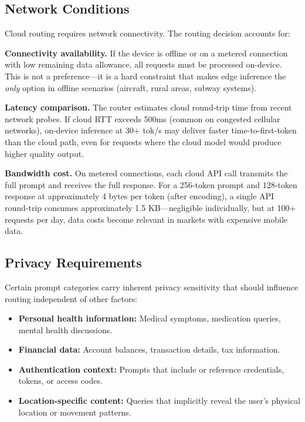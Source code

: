 \documentclass[12pt, letterpaper, twoside]{report}
\begin{document}
\subsection{Network Conditions}
\label{subsec:network}

Cloud routing requires network connectivity. The routing decision accounts for:

\textbf{Connectivity availability.} If the device is offline or on a metered connection with low remaining data allowance, all requests must be processed on-device. This is not a preference---it is a hard constraint that makes edge inference the \textit{only} option in offline scenarios (aircraft, rural areas, subway systems).

\textbf{Latency comparison.} The router estimates cloud round-trip time from recent network probes. If cloud RTT exceeds 500ms (common on congested cellular networks), on-device inference at 30+ tok/s may deliver faster time-to-first-token than the cloud path, even for requests where the cloud model would produce higher quality output.

\textbf{Bandwidth cost.} On metered connections, each cloud API call transmits the full prompt and receives the full response. For a 256-token prompt and 128-token response at approximately 4 bytes per token (after encoding), a single API round-trip consumes approximately 1.5 KB---negligible individually, but at 100+ requests per day, data costs become relevant in markets with expensive mobile data.

\subsection{Privacy Requirements}
\label{subsec:privacy_routing}

Certain prompt categories carry inherent privacy sensitivity that should influence routing independent of other factors:

\begin{itemize}[itemsep=1pt, topsep=2pt, parsep=0pt]
\item \textbf{Personal health information:} Medical symptoms, medication queries, mental health discussions.
\item \textbf{Financial data:} Account balances, transaction details, tax information.
\item \textbf{Authentication context:} Prompts that include or reference credentials, tokens, or access codes.
\item \textbf{Location-specific content:} Queries that implicitly reveal the user's physical location or movement patterns.
\end{itemize}
\end{document}
